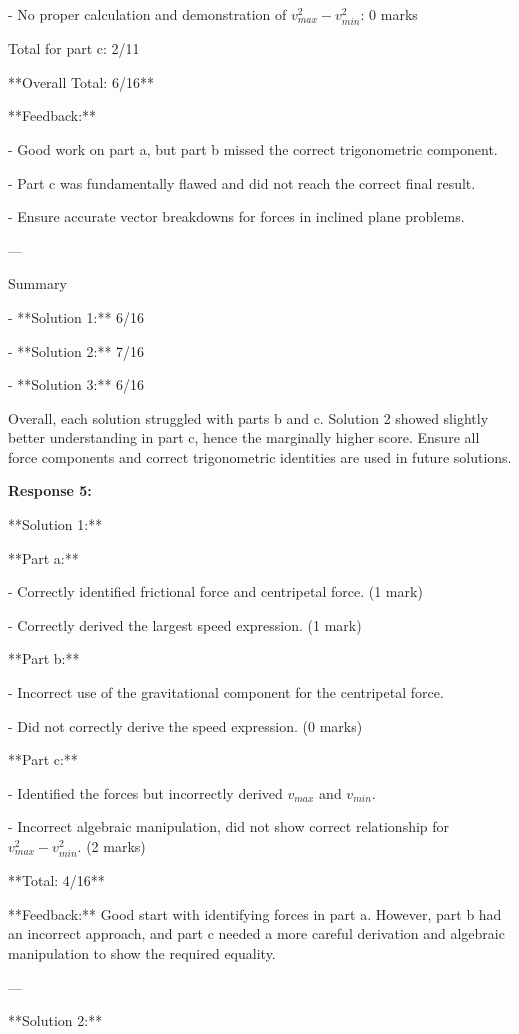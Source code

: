 \documentclass[a4paper,11pt]{article}
\begin{document}
- No proper calculation and demonstration of \(v_{max}^{2} - v_{min}^{2}\): 0 marks

Total for part c: 2/11

**Overall Total: 6/16**

**Feedback:**

- Good work on part a, but part b missed the correct trigonometric component.

- Part c was fundamentally flawed and did not reach the correct final result.

- Ensure accurate vector breakdowns for forces in inclined plane problems.

---

Summary

- **Solution 1:** 6/16

- **Solution 2:** 7/16

- **Solution 3:** 6/16

Overall, each solution struggled with parts b and c. Solution 2 showed slightly better understanding in part c, hence the marginally higher score. Ensure all force components and correct trigonometric identities are used in future solutions.

\bigskip
\textbf{Response 5:}

**Solution 1:**

**Part a:**

- Correctly identified frictional force and centripetal force. (1 mark)

- Correctly derived the largest speed expression. (1 mark)

**Part b:**

- Incorrect use of the gravitational component for the centripetal force.

- Did not correctly derive the speed expression. (0 marks)

**Part c:**

- Identified the forces but incorrectly derived \(v_{max}\) and \(v_{min}\).

- Incorrect algebraic manipulation, did not show correct relationship for \(v_{max}^2 - v_{min}^2\). (2 marks)

**Total: 4/16**

**Feedback:**
Good start with identifying forces in part a. However, part b had an incorrect approach, and part c needed a more careful derivation and algebraic manipulation to show the required equality.

---

**Solution 2:**
\end{document}
